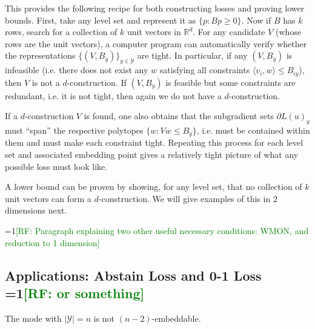 \documentclass[anon,12pt]{colt2019}
\newcommand{\Comments}{1}
\newcommand{\mynote}[2]{\ifnum\Comments=1\textcolor{#1}{#2}\fi}
\newcommand{\raf}[1]{\mynote{green}{[RF: #1]}}
\newcommand{\reals}{\mathbb{R}}
\newcommand{\Y}{\mathcal{Y}}
\begin{document}
This provides the following recipe for both constructing losses and proving lower bounds.
First, take any level set and represent it as $\{p : Bp \geq 0\}$.
Now if $B$ has $k$ rows, search for a collection of $k$ unit vectors in $\reals^d$.
For any candidate $V$ (whose rows are the unit vectors), a computer program can automatically verify whether the representations $\{(V,B_y)\}_{y \in \Y}$ are tight.
In particular, if any $(V,B_y)$ is infeasible (i.e. there does not exist any $w$ satisfying all constraints $\langle v_i, w \rangle \leq B_{iy}$), then $V$ is not a $d$-construction.
If $(V,B_y)$ is feasible but some constraints are redundant, i.e. it is not tight, then again we do not have a $d$-construction.

If a $d$-construction $V$ is found, one also obtains that the subgradient sets $\partial L(u)_y$ must ``span'' the respective polytopes $\{w : Vw \leq B_y\}$, i.e. must be contained within them and must make each constraint tight.
Repeating this process for each level set and associated embedding point gives a relatively tight picture of what any possible loss must look like.

A lower bound can be proven by showing, for any level set, that no collection of $k$ unit vectors can form a $d$-construction.
We will give examples of this in $2$ dimensions next.

\raf{Paragraph explaining two other useful necessary conditions: WMON, and reduction to 1 dimension}

\subsection{Applications: Abstain Loss and 0-1 Loss \raf{or something}}

\begin{theorem}
  The mode with $|\Y|=n$ is not $(n-2)$-embeddable.
\end{theorem}
\end{document}
